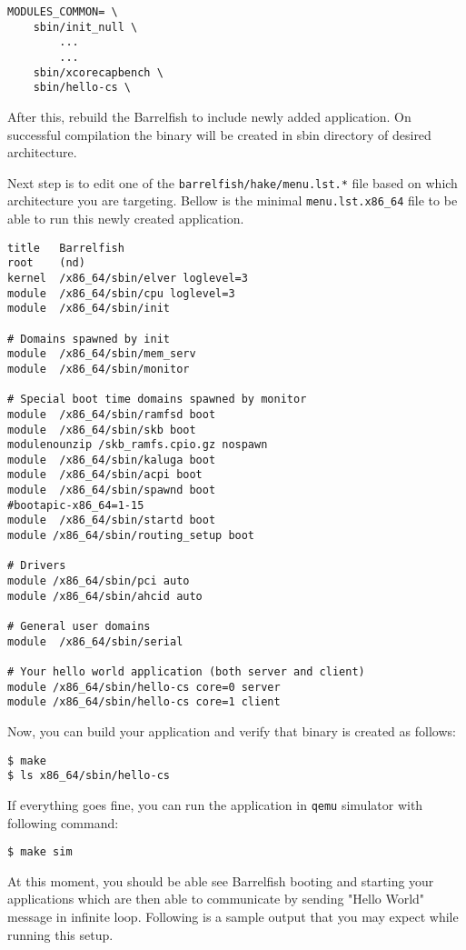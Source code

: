 \begin{verbatim}
MODULES_COMMON= \
	sbin/init_null \
        ...
        ...
	sbin/xcorecapbench \
	sbin/hello-cs \

\end{verbatim}

After this, rebuild the Barrelfish to include newly added application.  On
successful compilation the binary will be created in sbin directory of
desired architecture.


Next step is to edit one of the \texttt{barrelfish/hake/menu.lst.*} file based
on which architecture you are targeting.  Bellow is the minimal
\texttt{menu.lst.x86\_64} file to be able to run this newly created application.

\begin{verbatim}
title	Barrelfish
root	(nd)
kernel	/x86_64/sbin/elver loglevel=3
module	/x86_64/sbin/cpu loglevel=3
module	/x86_64/sbin/init

# Domains spawned by init
module	/x86_64/sbin/mem_serv
module	/x86_64/sbin/monitor

# Special boot time domains spawned by monitor
module  /x86_64/sbin/ramfsd boot
module  /x86_64/sbin/skb boot
modulenounzip /skb_ramfs.cpio.gz nospawn
module  /x86_64/sbin/kaluga boot
module  /x86_64/sbin/acpi boot
module  /x86_64/sbin/spawnd boot
#bootapic-x86_64=1-15
module  /x86_64/sbin/startd boot
module /x86_64/sbin/routing_setup boot

# Drivers
module /x86_64/sbin/pci auto
module /x86_64/sbin/ahcid auto

# General user domains
module	/x86_64/sbin/serial

# Your hello world application (both server and client)
module /x86_64/sbin/hello-cs core=0 server
module /x86_64/sbin/hello-cs core=1 client
\end{verbatim}

Now, you can build your application and verify that binary is created as
follows:

\begin{verbatim}
$ make
$ ls x86_64/sbin/hello-cs
\end{verbatim}

If everything goes fine, you can run the application in \texttt{qemu} simulator
with following command:
\begin{verbatim}
$ make sim
\end{verbatim}

At this moment, you should be able see Barrelfish booting and starting your
applications which are then able to communicate by sending "Hello World"
message in infinite loop.  Following is a sample output that you may expect
while running this setup.


